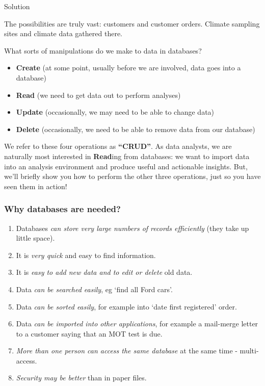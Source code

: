 \documentclass[11pt]{article}
\providecommand{\tightlist}{%
      \setlength{\itemsep}{0pt}\setlength{\parskip}{0pt}}
\begin{document}
Solution

The possibilities are truly vast: customers and customer orders. Climate
sampling sites and climate data gathered there.

What sorts of manipulations do we make to data in databases?

\begin{itemize}
\tightlist
\item
  \textbf{Create} (at some point, usually before we are involved, data
  goes into a database)
\item
  \textbf{Read} (we need to get data out to perform analyses)
\item
  \textbf{Update} (occasionally, we may need to be able to change data)
\item
  \textbf{Delete} (occasionally, we need to be able to remove data from
  our database)
\end{itemize}

We refer to these four operations as \textbf{``CRUD''}. As data
analysts, we are naturally most interested in \textbf{Read}ing from
databases: we want to import data into an analysis environment and
produce useful and actionable insights. But, we'll briefly show you how
to perform the other three operations, just so you have seen them in
action!

    \hypertarget{why-databases-are-needed}{%
\subsubsection{Why databases are
needed?}\label{why-databases-are-needed}}

\begin{enumerate}
\def\labelenumi{\arabic{enumi}.}
\tightlist
\item
  Databases \emph{can store very large numbers of records efficiently}
  (they take up little space).
\item
  It is \emph{very quick} and easy to find information.
\item
  It is \emph{easy to add new data and to edit or delete} old data.
\item
  Data \emph{can be searched easily}, eg `find all Ford cars'.
\item
  Data \emph{can be sorted easily}, for example into `date first
  registered' order.
\item
  Data \emph{can be imported into other applications}, for example a
  mail-merge letter to a customer saying that an MOT test is due.
\item
  \emph{More than one person can access the same database} at the same
  time - multi-access.
\item
  \emph{Security may be better} than in paper files.
\end{enumerate}
\end{document}

